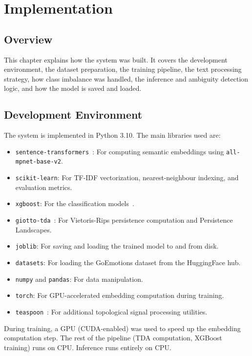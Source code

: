 \chapter{Implementation}
\sloppy

\section{Overview}

This chapter explains how the system was built. It covers the development environment, the
dataset preparation, the training pipeline, the text processing strategy, how class imbalance was
handled, the inference and ambiguity detection logic, and how the model is saved and loaded.

\section{Development Environment}

The system is implemented in Python 3.10. The main libraries used are:

\begin{itemize}
    \item \texttt{sentence-\allowbreak trans\-for\-mers}~\cite{sentence_bert}: For computing semantic embeddings using
    \texttt{all-mpnet-\allowbreak base-v2}.
    \item \texttt{scikit-learn}: For TF-IDF vectorization, nearest-neighbour indexing, and
    evaluation metrics.
    \item \texttt{xgboost}: For the classification models~\cite{xgboost_emotion}.
    \item \texttt{giotto-tda}~\cite{giotto}: For Vietoris-Rips persistence computation and Persistence
    Landscapes.
    \item \texttt{joblib}: For saving and loading the trained model to and from disk.
    \item \texttt{datasets}: For loading the GoEmotions dataset from the HuggingFace hub.
    \item \texttt{numpy} and \texttt{pandas}: For data manipulation.
    \item \texttt{torch}: For GPU-accelerated embedding computation during training.
    \item \texttt{teaspoon}~\cite{teaspoon}: For additional topological signal processing utilities.
\end{itemize}

During training, a GPU (CUDA-enabled) was used to speed up the embedding computation step.
The rest of the pipeline (TDA computation, XGBoost training) runs on CPU. Inference runs
entirely on CPU.

